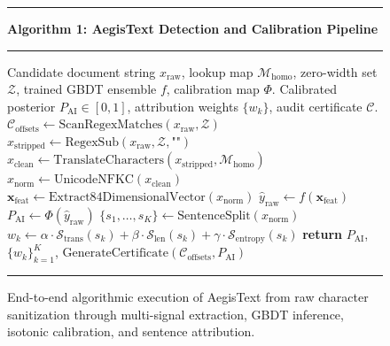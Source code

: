 \documentclass[conference]{IEEEtran}
\begin{document}
\begin{figure}[htbp]
\centering
\begin{minipage}{0.98\columnwidth}
\hrule \vspace{3pt}
\textbf{Algorithm 1: AegisText Detection and Calibration Pipeline}
\vspace{3pt} \hrule \vspace{4pt}
\begin{algorithmic}[1]
\REQUIRE Candidate document string $x_{\text{raw}}$, lookup map $\mathcal{M}_{\text{homo}}$, zero-width set $\mathcal{Z}$, trained GBDT ensemble $f$, calibration map $\Phi$.
\ENSURE Calibrated posterior $P_{\text{AI}} \in [0, 1]$, attribution weights $\{w_k\}$, audit certificate $\mathcal{C}$.
\STATE $\mathcal{C}_{\text{offsets}} \leftarrow \text{ScanRegexMatches}(x_{\text{raw}}, \mathcal{Z})$
\STATE $x_{\text{stripped}} \leftarrow \text{RegexSub}(x_{\text{raw}}, \mathcal{Z}, \text{""})$
\STATE $x_{\text{clean}} \leftarrow \text{TranslateCharacters}(x_{\text{stripped}}, \mathcal{M}_{\text{homo}})$
\STATE $x_{\text{norm}} \leftarrow \text{UnicodeNFKC}(x_{\text{clean}})$
\STATE $\mathbf{x}_{\text{feat}} \leftarrow \text{Extract84DimensionalVector}(x_{\text{norm}})$
\STATE $\hat{y}_{\text{raw}} \leftarrow f(\mathbf{x}_{\text{feat}})$
\STATE $P_{\text{AI}} \leftarrow \Phi(\hat{y}_{\text{raw}})$ 
\STATE $\{s_1, \dots, s_K\} \leftarrow \text{SentenceSplit}(x_{\text{norm}})$
    \STATE $w_k \leftarrow \alpha \cdot \mathcal{S}_{\text{trans}}(s_k) + \beta \cdot \mathcal{S}_{\text{len}}(s_k) + \gamma \cdot \mathcal{S}_{\text{entropy}}(s_k)$
\ENDFOR
\STATE \textbf{return} $P_{\text{AI}}$, $\{w_k\}_{k=1}^K$, $\text{GenerateCertificate}(\mathcal{C}_{\text{offsets}}, P_{\text{AI}})$
\end{algorithmic}
\vspace{3pt} \hrule
\end{minipage}
\caption{End-to-end algorithmic execution of AegisText from raw character sanitization through multi-signal extraction, GBDT inference, isotonic calibration, and sentence attribution.}
\label{alg:pipeline}
\end{figure}
\end{document}
